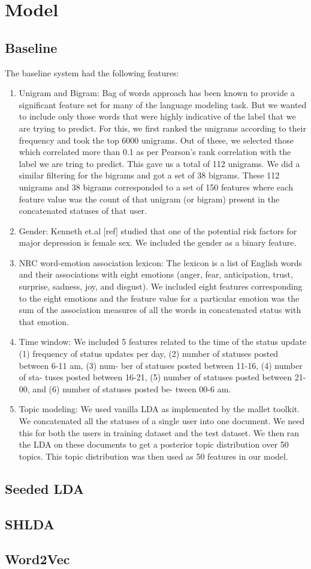 \section{Model}
\subsection{Baseline}
The  baseline system had the following features:
\begin{enumerate}
  \item Unigram and Bigram: Bag of words approach has been known to provide a significant feature set for many of the language modeling task. But we wanted to include only those words that were highly indicative of the label that we are trying to predict. For this, we first ranked the unigrams according to their frequency and took the top 6000 unigrams. Out of these, we selected those which correlated more than 0.1 as per Pearson's rank correlation with the label we are tring to predict. This gave us a total of 112 unigrams. We did a similar filtering for the bigrams and got a set of 38 bigrams. These 112 unigrams and 38 bigrams corresponded to a set of 150 features where each feature value was the count of that unigram (or bigram) present in the concatenated statuses of that user.
  \item Gender: Kenneth et.al [ref] studied that one of the potential risk factors for major depression is female sex. We included the gender as a binary feature.
  \item NRC word-emotion association lexicon: The lexicon is a list of English words and their associations with eight emotions (anger, fear, anticipation, trust, surprise, sadness, joy, and disgust). We included eight features corresponding to the eight emotions and the feature value for a particular emotion was the sum of the association measures of all the words in concatenated status with that emotion.
  \item Time window:  We included 5 features  related to the time of the status update (1) frequency of status updates per day, (2) number of statuses posted between 6-11 am, (3) num- ber of statuses posted between 11-16, (4) number of sta- tuses posted between 16-21, (5) number of statuses posted between 21-00, and (6) number of statuses posted be- tween 00-6 am.
  \item Topic modeling: We used vanilla LDA as implemented by the mallet toolkit. We concatenated all the statuses of a single user into one document. We need this for both the users in training dataset and the test dataset. We then ran the LDA on these documents to get a posterior topic distribution over 50 topics. This topic distribution was then used as 50 features in our model.
\end{enumerate}
\subsection{Seeded LDA}
\subsection{SHLDA}
\subsection{Word2Vec}
\label{model}
